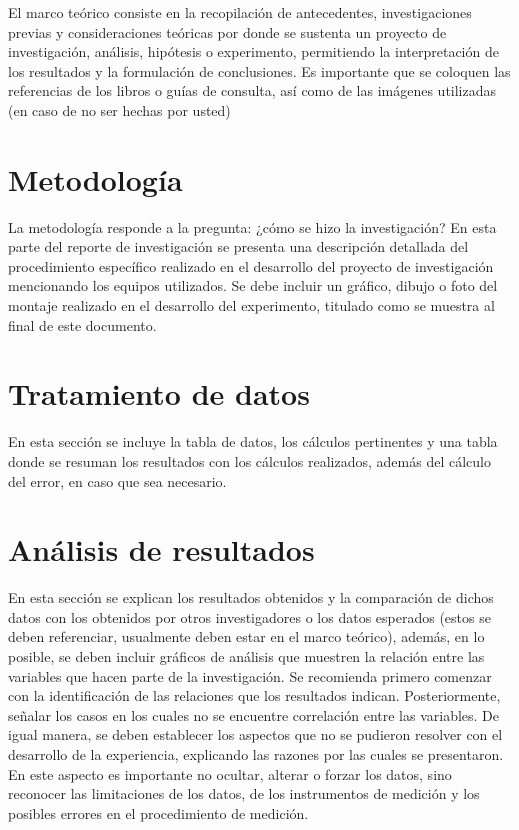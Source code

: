 \documentclass[11pt,letterpaper, twocolumn]{article}
\begin{document}
El marco teórico consiste en la recopilación de antecedentes, investigaciones previas y consideraciones teóricas por donde se sustenta un proyecto de investigación, análisis, hipótesis o experimento, permitiendo la interpretación de los resultados y la formulación de conclusiones. Es importante que se coloquen las referencias de los libros o guías de consulta, así como de las imágenes utilizadas (en caso de no ser hechas por usted)


\section{Metodología}
La metodología responde a la pregunta: ¿cómo se hizo la investigación?  En esta parte del reporte de investigación se presenta una descripción detallada del procedimiento específico realizado en el desarrollo del proyecto de investigación mencionando los equipos utilizados. Se debe incluir un gráfico, dibujo o foto del montaje realizado en el desarrollo del experimento, titulado como se muestra al final de este documento.


\section{Tratamiento de datos}
En esta sección se incluye la tabla de datos, los cálculos pertinentes y una tabla donde se resuman los resultados con los cálculos realizados, además del cálculo del error, en caso que sea necesario.


\section{Análisis de resultados}

En esta sección se explican los resultados obtenidos y la comparación de dichos datos con los obtenidos por otros investigadores o los datos esperados (estos se deben referenciar, usualmente deben estar en el marco teórico), además, en lo posible, se deben incluir gráficos de análisis que muestren la relación entre las variables que hacen parte de la investigación.  Se recomienda primero comenzar con la identificación de las relaciones que los resultados indican.  Posteriormente, señalar los casos en los cuales no se encuentre correlación entre las variables.  De igual manera, se deben establecer los aspectos que no se pudieron resolver con el desarrollo de la experiencia, explicando las razones por las cuales se presentaron.  En este aspecto es importante no ocultar, alterar o forzar los datos, sino reconocer las limitaciones de los datos, de los instrumentos de medición y los posibles errores en el procedimiento de medición.
\end{document}
